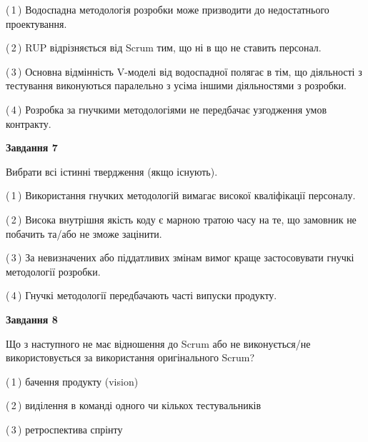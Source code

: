 \documentclass[10pt, ukrainian]{article}
\begin{document}
{\begin {large}
(\,1\,) Водоспадна методологія розробки може призводити до недостатнього проектування. %



(\,2\,) RUP відрізняється від Scrum тим, що ні в що не ставить персонал.%



(\,3\,) Основна відмінність V-моделі від водоспадної полягає в тім, що діяльності з тестування виконуються паралельно з усіма іншими діяльностями з розробки. %



(\,4\,) Розробка за гнучкими методологіями не передбачає узгодження умов контракту. %


{\begin {center}\textbf{Завдання 7}\end {center}}\par
Вибрати всі істинні твердження (якщо існують).\par
\vspace{2mm}



(\,1\,) Використання гнучких методологій вимагає високої кваліфікації персоналу. %



(\,2\,) Висока внутрішня якість коду є марною тратою часу на те, що замовник не побачить та/або не зможе зацінити. %



(\,3\,) За невизначених або піддатливих змінам вимог краще застосовувати гнучкі методології розробки. %



(\,4\,) Гнучкі методології передбачають часті випуски продукту. %


{\begin {center}\textbf{Завдання 8}\end {center}}\par
Що з наступного не має відношення до Scrum або не виконується/не використовується за використання оригінального Scrum?\par
\vspace{2mm}



(\,1\,) бачення продукту (vision) %



(\,2\,) виділення в команді одного чи кількох тестувальників%



(\,3\,) ретроспектива спрінту%




\end{large}}
\end{document}
